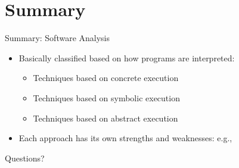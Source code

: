 \documentclass[10pt]{beamer}
\begin{document}
	\section{Summary}
	\begin{frame}{Summary: Software Analysis}
		\begin{itemize}
			\item Basically classified based on how programs are interpreted:
			\begin{itemize}
				\item Techniques based on concrete execution
				\item Techniques based on symbolic execution
				\item Techniques based on abstract execution
			\end{itemize}
			\item Each approach has its own strengths and weaknesses: e.g.,
		\end{itemize}
		\begin{table}[h!]
		\end{table}
	\end{frame}
	
	\newpage
	{
		\begin{frame}[standout]
			Questions?
		\end{frame}
	}
	
	
\end{document}
